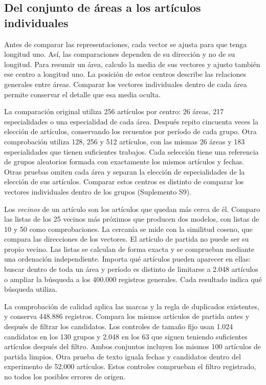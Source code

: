 \documentclass[12pt]{article}
\begin{document}
\subsection{Del conjunto de áreas a los artículos individuales}
Antes de comparar las representaciones, cada vector se ajusta para que tenga longitud uno. Así, las comparaciones dependen de su dirección y no de su longitud. Para resumir un área, calculo la media de sus vectores y ajusto también ese centro a longitud uno. La posición de estos centros describe las relaciones generales entre áreas. Comparar los vectores individuales dentro de cada área permite conservar el detalle que esa media oculta.

La comparación original utiliza 256 artículos por centro: 26 áreas, 217 especialidades o una especialidad de cada área. Después repito cincuenta veces la elección de artículos, conservando los recuentos por período de cada grupo. Otra comprobación utiliza 128, 256 y 512 artículos, con las mismas 26 áreas y 183 especialidades que tienen suficientes trabajos. Cada selección tiene una referencia de grupos aleatorios formada con exactamente los mismos artículos y fechas. Otras pruebas omiten cada área y separan la elección de especialidades de la elección de sus artículos. Comparar estos centros es distinto de comparar los vectores individuales dentro de los grupos (Suplemento S9).

Los \emph{vecinos} de un artículo son los artículos que quedan más cerca de él. Comparo las listas de los 25 vecinos más próximos que producen dos modelos, con listas de 10 y 50 como comprobaciones. La cercanía se mide con la similitud coseno, que compara las direcciones de los vectores. El artículo de partida no puede ser su propio vecino. Las listas se calculan de forma exacta y se comprueban mediante una ordenación independiente. Importa qué artículos pueden aparecer en ellas: buscar dentro de toda un área y período es distinto de limitarse a 2.048 artículos o ampliar la búsqueda a los 400.000 registros generales. Cada resultado indica qué búsqueda utiliza.

La comprobación de calidad aplica las marcas y la regla de duplicados existentes, y conserva 448.886 registros. Compara los mismos artículos de partida antes y después de filtrar los candidatos. Los controles de tamaño fijo usan 1.024 candidatos en los 130 grupos y 2.048 en los 63 que siguen teniendo suficientes artículos después del filtro. Ambos conjuntos incluyen los mismos 100 artículos de partida limpios. Otra prueba de texto iguala fechas y candidatos dentro del experimento de 52.000 artículos. Estos controles comprueban el filtro registrado, no todos los posibles errores de origen.
\end{document}
